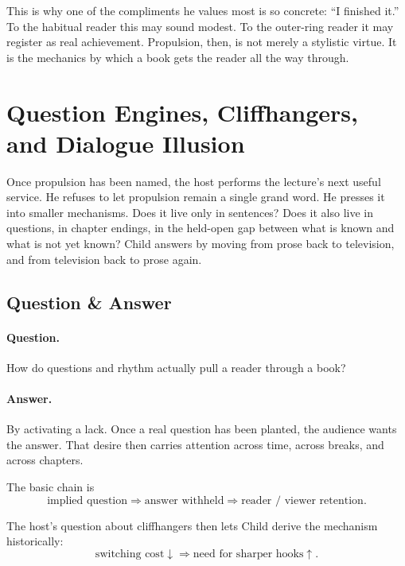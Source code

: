 This is why one of the compliments he values most is so concrete: ``I finished it.'' To the habitual reader this may sound modest. To the outer-ring reader it may register as real achievement. Propulsion, then, is not merely a stylistic virtue. It is the mechanics by which a book gets the reader all the way through.

\section{Question Engines, Cliffhangers, and Dialogue Illusion}

Once propulsion has been named, the host performs the lecture's next useful service. He refuses to let propulsion remain a single grand word. He presses it into smaller mechanisms. Does it live only in sentences? Does it also live in questions, in chapter endings, in the held-open gap between what is known and what is not yet known? Child answers by moving from prose back to television, and from television back to prose again.

\subsection{Question \& Answer}

\paragraph{Question.} How do questions and rhythm actually pull a reader through a book?

\paragraph{Answer.} By activating a lack. Once a real question has been planted, the audience wants the answer. That desire then carries attention across time, across breaks, and across chapters.

The basic chain is
\begin{equation}
\text{implied question} \Longrightarrow \text{answer withheld} \Longrightarrow \text{reader / viewer retention}.
\end{equation}

The host's question about cliffhangers then lets Child derive the mechanism historically:
\begin{equation}
\text{switching cost} \downarrow \Longrightarrow \text{need for sharper hooks} \uparrow.
\end{equation}

